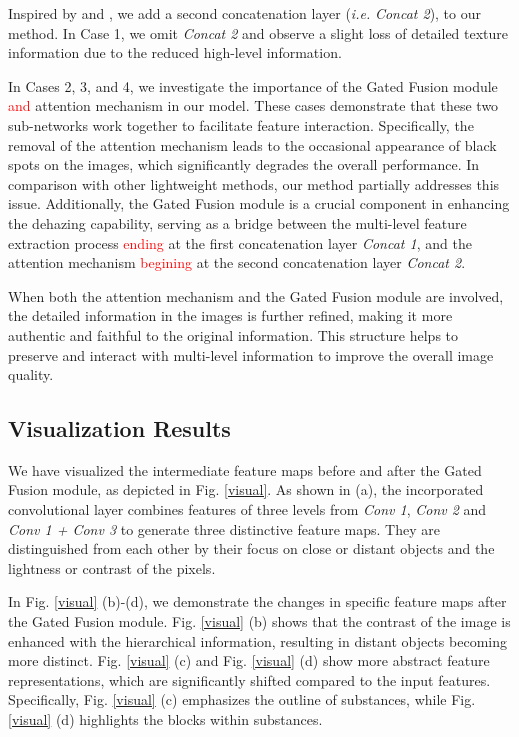 \documentclass[lettersize,journal]{IEEEtran}
\begin{document}
Inspired by \cite{li2017aod} and \cite{ullah2021light}, we add a second concatenation layer (\textit{i.e.} \textit{Concat 2}), to our method. In Case 1, we omit \textit{Concat 2} and observe a slight loss of detailed texture information due to the reduced high-level information. 

In Cases 2, 3, and 4, we investigate the importance of the Gated Fusion module \textcolor{red}{and} attention mechanism in our model. These cases demonstrate that these two sub-networks work together to facilitate feature interaction. Specifically, the removal of the attention mechanism leads to the occasional appearance of black spots on the images, which significantly degrades the overall performance. In comparison with other lightweight methods, our method partially addresses this issue. Additionally, the Gated Fusion module is a crucial component in enhancing the dehazing capability, serving as a bridge between the multi-level feature extraction process \textcolor{red}{ending} at the first concatenation layer \textit{Concat 1}, and the attention mechanism \textcolor{red}{begining} at the second concatenation layer \textit{Concat 2}. 

When both the attention mechanism and the Gated Fusion module are involved, the detailed information in the images is further refined, making it more authentic and faithful to the original information. This structure helps to preserve and interact with multi-level information to improve the overall image quality.  

\subsection{Visualization Results}
We have visualized the intermediate feature maps before and after the Gated Fusion module, as  depicted in Fig. \ref{visual}. As shown in (a), the incorporated convolutional layer combines features of three levels from \textit{Conv 1}, \textit{Conv 2} and \textit{Conv 1 + Conv 3} to generate three distinctive feature maps. They are distinguished from each other by their focus on close or distant objects and the lightness or contrast of the pixels. 

In Fig. \ref{visual} (b)-(d), we demonstrate the changes in specific feature maps after the Gated Fusion module. Fig. \ref{visual} (b) shows that the contrast of the image is enhanced with the hierarchical information, resulting in distant objects becoming more distinct. Fig. \ref{visual} (c) and Fig. \ref{visual} (d) show more abstract feature representations, which are significantly shifted compared to the input features. Specifically, Fig. \ref{visual} (c) emphasizes the outline of substances, while Fig. \ref{visual} (d) highlights the blocks within substances.
\end{document}
